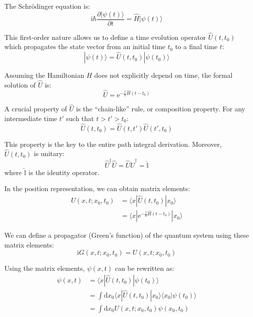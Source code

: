 The Schrödinger equation is:
\begin{equation}
\mathrm{i}\hbar \frac{\partial |\psi(t)\rangle}{\partial t} = \hat{H}|\psi(t)\rangle
\end{equation}

This first-order nature allows us to define a time evolution
operator $\hat{U}(t, t_0)$ which propagates the state vector from
an initial time $t_0$ to a final time $t$:
\begin{equation}
|\psi(t)\rangle = \hat{U}(t, t_0)|\psi(t_0)\rangle
\end{equation}

Assuming the Hamiltonian $H$ does not explicitly depend on
time, the formal solution of $\hat{U}$ is:
\begin{equation}
\hat{U} = \mathrm{e}^{-\frac{\mathrm{i}}{\hbar}\hat{H}(t-t_0)}
\end{equation}

A crucial property of $\hat{U}$ is the \enquote{chain-like} rule, or composition property. For any intermediate time $t'$ such that $t>t'>t_0$:
\begin{equation}
\hat{U}(t, t_0) = \hat{U}(t, t') \hat{U}(t', t_0)
\end{equation}

This property is the key to the entire path integral derivation.
Moreover, $\hat{U}(t, t_0)$ is unitary:
\begin{equation}
\hat{U}^{\dagger}\hat{U} = \hat{U}\hat{U}^{\dagger} = \hat{\mathbb{I}}
\end{equation}
where $\hat{\mathbb{I}}$ is the identity operator.

In the position representation, we can obtain matrix elements:
\begin{equation}
\begin{aligned}
U(x, t; x_0, t_0) &= \langle x | \hat{U}(t, t_0) | x_0 \rangle \\
&= \langle x | \mathrm{e}^{-\frac{\mathrm{i}}{\hbar}\hat{H}(t-t_0)} | x_0 \rangle
\end{aligned}
\end{equation}

We can define a propagator (Green's function) of the quantum system using these matrix elements:
\begin{equation}
\mathrm{i}G(x, t; x_0, t_0) = U(x, t; x_0, t_0)
\end{equation}

Using the matrix elements, $\psi(x, t)$ can be rewritten as:
\begin{equation}
\begin{aligned}
\psi(x, t) &= \langle x | \hat{U}(t, t_0) | \psi(t_0) \rangle \\
&= \int \mathrm{d}x_0 \langle x | \hat{U}(t, t_0) | x_0 \rangle \langle x_0 | \psi(t_0) \rangle \\
&= \int \mathrm{d}x_0 U(x, t; x_0, t_0) \psi(x_0, t_0)
\end{aligned}
\end{equation}

